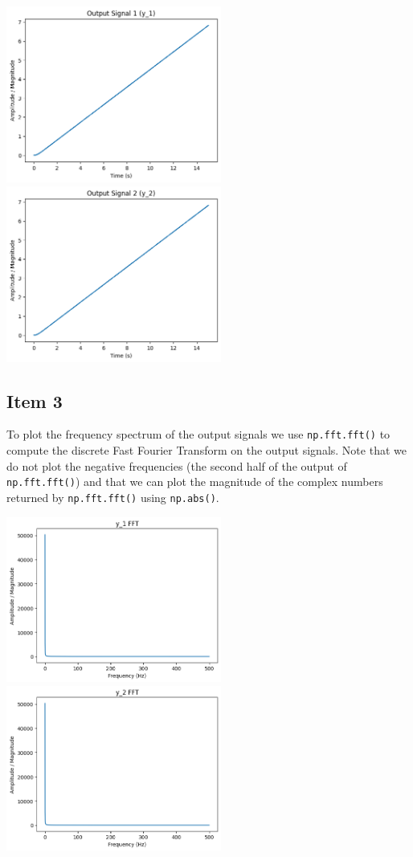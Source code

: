 \documentclass[11pt]{article}
\begin{document}
\includegraphics[width=200pt]{p1_3.png}
\includegraphics[width=200pt]{p1_4.png}

\subsection{Item 3}

To plot the frequency spectrum of the output signals we use \texttt{np.fft.fft()} to compute the discrete Fast Fourier Transform on the output signals. Note that we do not plot the negative frequencies (the second half of the output of \texttt{np.fft.fft()}) and that we can plot the magnitude of the complex numbers returned by \texttt{np.fft.fft()} using \texttt{np.abs()}.

\includegraphics[width=200pt]{p1_5.png}
\includegraphics[width=200pt]{p1_6.png}
\end{document}
